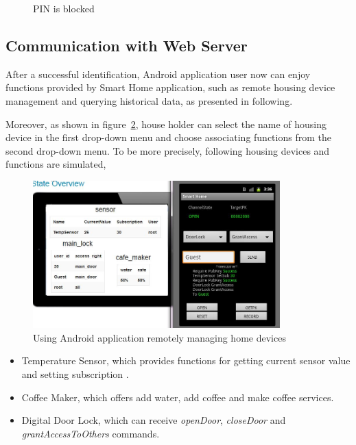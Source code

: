 \begin{figure}[!htb]
\begin{minipage}{0.49\linewidth}
  \caption{PIN is blocked}
  \label{fig:sub2}
\end{minipage}
  \end{figure}

\subsection{Communication with Web Server}
After a successful identification, Android application user now can enjoy functions provided by Smart Home application, such as remote housing device management and querying historical data, as presented in following.

Moreover, as shown in figure~\ref{fig:housing-device}, house holder can select the name of housing device in the first drop-down menu and  choose associating functions from the second drop-down menu. To be more precisely, following housing devices and functions are simulated,
\begin{figure}[!htb]
	\centering
	\includegraphics[width=0.85\textwidth]{Images/impl/housing-device.jpg}
		\caption{Using Android application remotely managing home devices}
	\label{fig:housing-device}
\end{figure}

\begin{itemize}
\item Temperature Sensor, which provides functions for getting current sensor value and setting subscription .
\item Coffee Maker,  which offers add water, add coffee and make coffee services.
\item Digital Door Lock, which can receive  \emph{openDoor}, \emph{closeDoor} and  \emph{grantAccessToOthers} commands.
\end{itemize}

